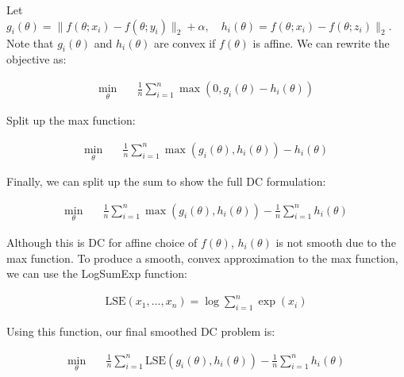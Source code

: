 \documentclass[11pt]{article}
\begin{document}
Let $g_i(\theta) = \| f(\theta; x_i) - f(\theta; y_i)\|_2 + \alpha, \quad h_i(\theta) = f(\theta; x_i) - f(\theta; z_i)\|_2$. Note that $g_i(\theta)$ and $h_i(\theta)$ are convex if $f(\theta)$ is affine. We can rewrite the objective as:

\begin{equation}
\begin{aligned}
    \min_{\theta} \quad & \frac{1}{n} \sum_{i=1}^{n} \max(0, g_i(\theta) - h_i(\theta))
\end{aligned}
\end{equation}

Split up the max function:

\begin{equation}
\begin{aligned}
    \min_{\theta} \quad & \frac{1}{n} \sum_{i=1}^{n} \max(g_i(\theta), h_i(\theta)) - h_i(\theta)
\end{aligned}
\end{equation}

Finally, we can split up the sum to show the full DC formulation:

\begin{equation}
\begin{aligned}
    \min_{\theta} \quad & \frac{1}{n} \sum_{i=1}^{n} \max(g_i(\theta), h_i(\theta)) - \frac{1}{n} \sum_{i=1}^{n} h_i(\theta)
\end{aligned}
\end{equation}

Although this is DC for affine choice of $f(\theta)$, $h_i(\theta)$ is not smooth due to the max function. To produce a smooth, convex approximation to the max function, we can use the LogSumExp function:

\begin{equation}
\begin{aligned}
\textrm{LSE}(x_1, ..., x_n) = \log\sum_{i=1}^{n} \exp(x_i)
\end{aligned}
\end{equation}

Using this function, our final smoothed DC problem is:

\begin{equation}
\label{eq:smooth_dc}
\begin{aligned}
    \min_{\theta} \quad & \frac{1}{n} \sum_{i=1}^{n} \textrm{LSE}(g_i(\theta), h_i(\theta)) - \frac{1}{n} \sum_{i=1}^{n} h_i(\theta)
\end{aligned}
\end{equation}
\end{document}
